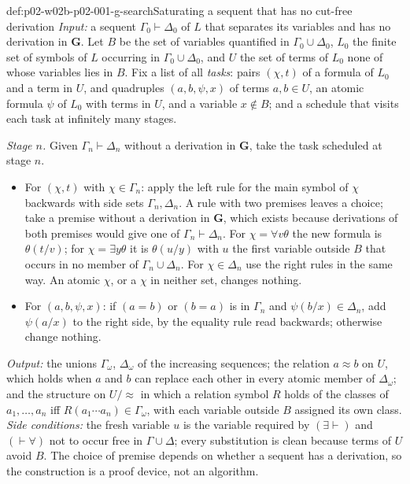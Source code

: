\begin{hbmethod}{def:p02-w02b-p02-001-g-search}{Saturating a sequent that has no cut-free derivation}
\emph{Input:} a sequent \(\Gamma_0\vdash\Delta_0\) of \(L\) that separates
its variables and has no derivation in \(\mathbf G\).  Let \(B\) be the set
of variables quantified in \(\Gamma_0\cup\Delta_0\), \(L_0\) the finite set
of symbols of \(L\) occurring in \(\Gamma_0\cup\Delta_0\), and \(U\) the
set of terms of \(L_0\) none of whose variables lies in \(B\).  Fix a list
of all \emph{tasks}: pairs \((\chi,t)\) of a formula of \(L_0\) and a term in
\(U\), and quadruples \((a,b,\psi,x)\) of terms \(a,b\in U\), an atomic
formula \(\psi\) of \(L_0\) with terms in \(U\), and a variable \(x\notin B\);
and a schedule that visits each task at infinitely many stages.

\emph{Stage \(n\).}  Given \(\Gamma_n\vdash\Delta_n\) without a derivation in
\(\mathbf G\), take the task scheduled at stage \(n\).
\begin{itemize}
\item For \((\chi,t)\) with \(\chi\in\Gamma_n\): apply the left rule for the
      main symbol of \(\chi\) backwards with side sets \(\Gamma_n,\Delta_n\).
      A rule with two premises leaves a choice; take a premise without a
      derivation in \(\mathbf G\), which exists because derivations of both
      premises would give one of \(\Gamma_n\vdash\Delta_n\).  For
      \(\chi=\forall v\theta\) the new formula is \(\theta(t/v)\); for
      \(\chi=\exists y\theta\) it is \(\theta(u/y)\) with \(u\) the first
      variable outside \(B\) that occurs in no member of
      \(\Gamma_n\cup\Delta_n\).  For \(\chi\in\Delta_n\) use the right rules
      in the same way.  An atomic \(\chi\), or a \(\chi\) in neither set,
      changes nothing.
\item For \((a,b,\psi,x)\): if \((a=b)\) or \((b=a)\) is in \(\Gamma_n\) and
      \(\psi(b/x)\in\Delta_n\), add \(\psi(a/x)\) to the right side, by the
      equality rule read backwards; otherwise change nothing.
\end{itemize}
\emph{Output:} the unions \(\Gamma_\omega\), \(\Delta_\omega\) of the
increasing sequences; the relation \(a\approx b\) on \(U\), which holds when
\(a\) and \(b\) can replace each other in every atomic member of
\(\Delta_\omega\); and the structure on \(U/{\approx}\) in which a relation
symbol \(R\) holds of the classes of \(a_1,\ldots,a_n\) iff
\(R(a_1\cdots a_n)\in\Gamma_\omega\), with each variable outside \(B\)
assigned its own class.
\emph{Side conditions:} the fresh variable \(u\) is the variable required
by \((\exists\vdash)\) and \((\vdash\forall)\) not to occur free in
\(\Gamma\cup\Delta\); every substitution is clean because terms of \(U\)
avoid \(B\).  The choice of premise depends on whether a sequent has a
derivation, so the construction is a proof device, not an algorithm.
\end{hbmethod}

